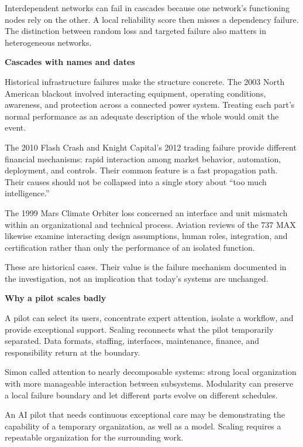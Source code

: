 \documentclass[11pt,openany]{book}
\newcommand{\subhead}[1]{\par\medskip\noindent\textbf{#1}\par\nobreak\smallskip}
\begin{document}
Interdependent networks can fail in cascades because one network's functioning nodes rely on the other.\cite{buldyrev2010} A local reliability score then misses a dependency failure. The distinction between random loss and targeted failure also matters in heterogeneous networks.\cite{albert2000error}

\subhead{Cascades with names and dates}

Historical infrastructure failures make the structure concrete. The 2003 North American blackout involved interacting equipment, operating conditions, awareness, and protection across a connected power system.\cite{uscanada2004} Treating each part's normal performance as an adequate description of the whole would omit the event.

The 2010 Flash Crash and Knight Capital's 2012 trading failure provide different financial mechanisms: rapid interaction among market behavior, automation, deployment, and controls.\cite{sec2010findings,sec2013knight} Their common feature is a fast propagation path. Their causes should not be collapsed into a single story about “too much intelligence.”

The 1999 Mars Climate Orbiter loss concerned an interface and unit mismatch within an organizational and technical process.\cite{nasa1999mishap} Aviation reviews of the 737 MAX likewise examine interacting design assumptions, human roles, integration, and certification rather than only the performance of an isolated function.\cite{jatr2019boeing}

These are historical cases. Their value is the failure mechanism documented in the investigation, not an implication that today's systems are unchanged.

\subhead{Why a pilot scales badly}

A pilot can select its users, concentrate expert attention, isolate a workflow, and provide exceptional support. Scaling reconnects what the pilot temporarily separated. Data formats, staffing, interfaces, maintenance, finance, and responsibility return at the boundary.

Simon called attention to nearly decomposable systems: strong local organization with more manageable interaction between subsystems.\cite{simon1962} Modularity can preserve a local failure boundary and let different parts evolve on different schedules.\cite{baldwin2000design}

An AI pilot that needs continuous exceptional care may be demonstrating the capability of a temporary organization, as well as a model. Scaling requires a repeatable organization for the surrounding work.
\end{document}
